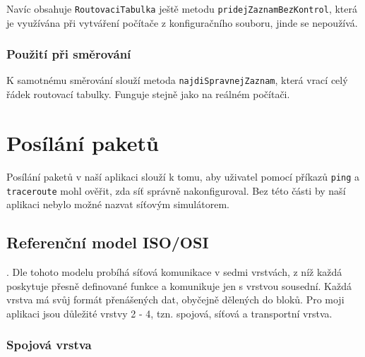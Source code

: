 Navíc obsahuje \verb|RoutovaciTabulka| ještě metodu \verb|pridejZaznamBezKontrol|, která je využívána při vytváření počítače z konfiguračního souboru, jinde se nepoužívá.

\subsubsection{Použití při směrování}

K samotnému směrování slouží metoda \verb|najdiSpravnejZaznam|, která vrací celý řádek routovací tabulky. Funguje stejně jako na reálném počítači.




\section{Posílání paketů}


Posílání paketů v naší aplikaci slouží k tomu, aby uživatel pomocí příkazů \verb|ping| a \verb|traceroute| mohl ověřit, zda síť správně nakonfiguroval. Bez této části by naší aplikaci nebylo možné nazvat síťovým simulátorem.


\subsection{Referenční model ISO/OSI}

\cite{wiki:referencni_model}. Dle tohoto modelu probíhá síťová komunikace v sedmi vrstvách, z níž každá poskytuje přesně definované funkce a komunikuje jen s vrstvou sousední. Každá vrstva má svůj formát přenášených dat, obyčejně dělených do bloků. Pro moji aplikaci jsou důležité vrstvy 2 - 4, tzn. spojová, síťová a transportní vrstva.

\subsubsection{Spojová vrstva}

